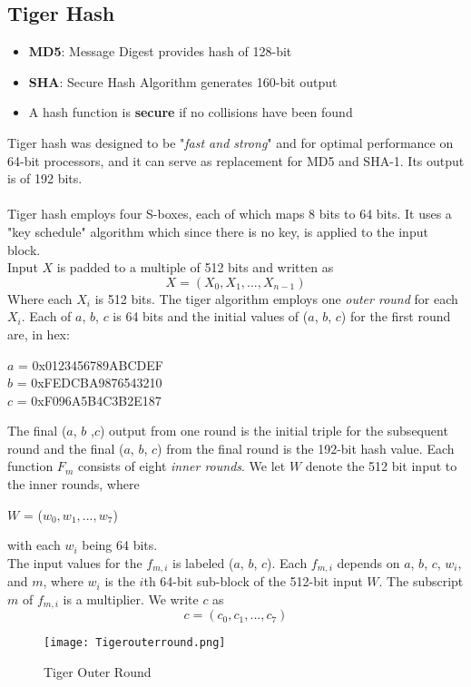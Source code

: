 \documentclass{article}
\begin{document}
\subsection{Tiger Hash}
\begin{itemize}
    \item \textbf{MD5}: Message Digest provides hash of 128-bit
    \item \textbf{SHA}: Secure Hash Algorithm generates 160-bit output
    \item A hash function is \textbf{secure} if no collisions have been found
\end{itemize}
Tiger hash was designed to be "\textit{fast and strong}" and for optimal performance on 64-bit processors, and it can serve as replacement for MD5 and SHA-1. Its output is of 192 bits.\\\\
Tiger hash employs four S-boxes, each of which maps 8 bits to 64 bits. It uses a "key schedule" algorithm  which since there is no key, is applied to the input block.\\
Input $X$ is padded to a multiple of 512 bits and written as
$$X = (X_0, X_1,...,X_{n-1})$$
Where each $X_i$ is 512 bits. The tiger algorithm employs one \textit{outer round} for each $X_i$. Each of $a$, $b$, $c$ is 64 bits and the initial values of ($a$, $b$, $c$) for the first round are, in hex:
\begin{center}
    $a$ = 0x0123456789ABCDEF\\
    $b$ = 0xFEDCBA9876543210\\
    $c$ = 0xF096A5B4C3B2E187\\
\end{center}
The final ($a$, $b$ ,$c$) output from one round is the initial triple for the subsequent round and the final ($a$, $b$, $c$) from the final round is the 192-bit hash value. Each function $F_m$ consists of eight \textit{inner rounds}. We let $W$ denote the 512 bit input to the inner rounds, where
\begin{center}
    $W$ = ($w_0, w_1,...,w_7$)
\end{center}
with each $w_i$ being 64 bits.\\
The input values for the $f_{m,i}$ is labeled ($a$, $b$, $c$). Each $f_{m,i}$ depends on $a$, $b$, $c$, $w_i$, and $m$, where $w_i$ is the $i$th 64-bit sub-block of the 512-bit input $W$. The subscript $m$ of $f_{m,i}$ is a multiplier. We write $c$ as
$$c = (c_0,c_1,...,c_7)$$
\begin{figure}[H]
    \centering
    \texttt{[image: Tigerouterround.png]}
    \caption{Tiger Outer Round}
\end{figure}
\end{document}
